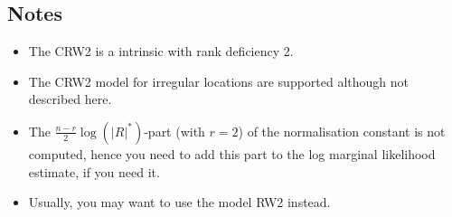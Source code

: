 \documentclass[a4paper,11pt]{article}
\begin{document}
\subsection*{Notes}


\begin{itemize}
\item The CRW2 is a intrinsic with rank deficiency 2.
\item The CRW2 model for irregular locations are supported although not
    described here.
\item The $\frac{n-r}{2}\log(|R|^{*})$-part (with $r=2$) of the
    normalisation constant is not computed, hence you need to add this
    part to the log marginal likelihood estimate, if you need it.
\item Usually, you may want to use the model RW2 instead.
\end{itemize}
\end{document}
